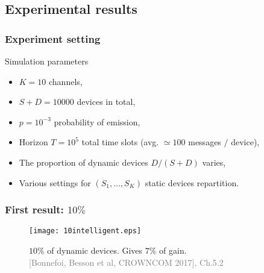 \subsection{Experimental results}

\subsubsection{Experiment setting}

\begin{frameO}

    \begin{colorblock}{Simulation parameters}

        \begin{itemize}
            \setlength\itemsep{10pt}
            \item
                  \(K = 10\) channels,
            \item
                  \(S + D = 10000\) devices in total,
            \item
                  \(p = 10^{-3}\) probability of emission,
            \item
                  Horizon \(T = 10^5\) total time slots (avg. \(\simeq 100\) messages \(/\)
                  device),
            \item
                  The proportion of dynamic devices \(D/(S+D)\) varies,
            \item
                  Various settings for \((S_1,\dots,S_{K})\) static devices
                  repartition.
        \end{itemize}

    \end{colorblock}

\end{frameO}



\subsubsection{First result: $10\%$}

\begin{frameO}

    \begin{figure}[h!]
        \centering
        \texttt{[image: 10intelligent.eps]}

            $10\%$ of dynamic devices. Gives $7\%$ of gain.\\
            {\tiny \textcolor{gray}{[Bonnefoi, Besson et al, CROWNCOM 2017], Ch.5.2}}
    \end{figure}

\end{frameO}




